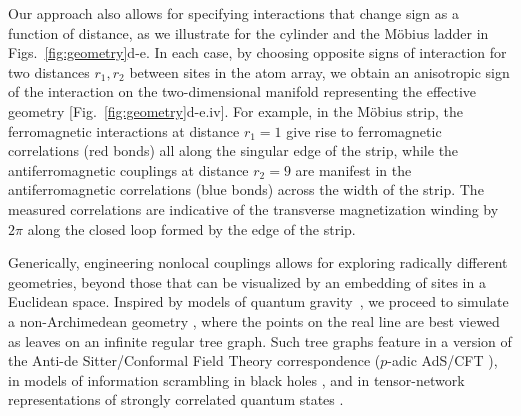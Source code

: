 \documentclass[aps,pra,twocolumn,superscriptaddress]{revtex4-1} %
\begin{document}
\begin{bibunit}
Our approach also allows for specifying interactions that change sign as a function of distance, as we illustrate for the cylinder and the M\"{o}bius ladder in Figs.~\ref{fig:geometry}d-e.  In each case, by choosing opposite signs of interaction for two distances $r_1, r_2$ between sites in the atom array, we obtain an anisotropic sign of the interaction on the two-dimensional manifold representing the effective geometry [Fig.~\ref{fig:geometry}d-e.iv].  For example, in the M\"{o}bius strip, the ferromagnetic interactions at distance $r_1 = 1$ give rise to ferromagnetic correlations (red bonds) all along the singular edge of the strip, while the antiferromagnetic couplings at distance $r_2=9$ are manifest in the antiferromagnetic correlations (blue bonds) across the width of the strip.  The measured correlations are indicative of the transverse magnetization winding by $2\pi$ along the closed loop formed by the edge of the strip.

Generically, engineering nonlocal couplings allows for exploring radically different geometries, beyond those that can be visualized by an embedding of sites in a Euclidean space.  Inspired by models of quantum gravity~\cite{gubser2017p,heydeman2016tensor}, we proceed to simulate a non-Archimedean geometry \cite{gubser2018continuum,bentsen2019treelike}, where the points on the real line are best viewed as leaves on an infinite regular tree graph.  Such tree graphs feature in a version of the Anti-de Sitter/Conformal Field Theory correspondence ($p$-adic AdS/CFT  \cite{gubser2017p,heydeman2016tensor}), in models of information scrambling in black holes \cite{barbon2013fast}, and in tensor-network representations of strongly correlated quantum states \cite{shi2006classical,murg2010simulating}.


\end{bibunit}
\end{document}
